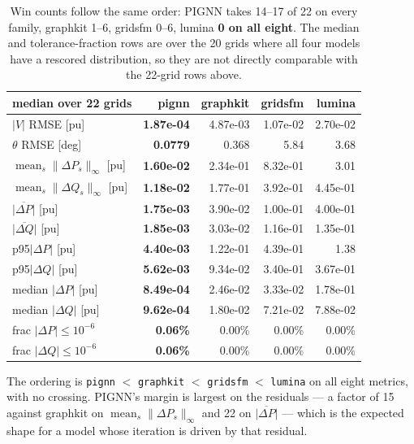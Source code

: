 \documentclass[10pt]{article}
\begin{document}
\begin{table}[H]
\centering\small
\begin{tabular}{lrrrr}
\toprule
median over 22 grids & pignn & graphkit & gridsfm & lumina \\
\midrule
$|V|$ RMSE [pu]              & \textbf{1.87e-04} & 4.87e-03 & 1.07e-02 & 2.70e-02 \\
$\theta$ RMSE [deg]          & \textbf{0.0779}   & 0.368    & 5.84     & 3.68 \\
$\operatorname{mean}_s\|\Delta P_s\|_\infty$ [pu] & \textbf{1.60e-02} & 2.34e-01 & 8.32e-01 & 3.01 \\
$\operatorname{mean}_s\|\Delta Q_s\|_\infty$ [pu] & \textbf{1.18e-02} & 1.77e-01 & 3.92e-01 & 4.45e-01 \\
$\overline{|\Delta P|}$ [pu] & \textbf{1.75e-03} & 3.90e-02 & 1.00e-01 & 4.00e-01 \\
$\overline{|\Delta Q|}$ [pu] & \textbf{1.85e-03} & 3.03e-02 & 1.16e-01 & 1.35e-01 \\
p95$|\Delta P|$ [pu]         & \textbf{4.40e-03} & 1.22e-01 & 4.39e-01 & 1.38 \\
p95$|\Delta Q|$ [pu]         & \textbf{5.62e-03} & 9.34e-02 & 3.40e-01 & 3.67e-01 \\
median $|\Delta P|$ [pu]   & \textbf{8.49e-04} & 2.46e-02 & 3.33e-02 & 1.78e-01 \\
median $|\Delta Q|$ [pu]   & \textbf{9.62e-04} & 1.80e-02 & 7.21e-02 & 7.88e-02 \\
frac $|\Delta P|\le10^{-6}$ & \textbf{0.06\%} & 0.00\% & 0.00\% & 0.00\% \\
frac $|\Delta Q|\le10^{-6}$ & \textbf{0.06\%} & 0.00\% & 0.00\% & 0.00\% \\
\bottomrule
\end{tabular}
\caption{Win counts follow the same order: PIGNN takes 14--17 of 22 on every
family, graphkit 1--6, gridsfm 0--6, lumina \textbf{0 on all eight}. The median
and tolerance-fraction rows are over the 20 grids where all four models have a
rescored distribution, so they are not directly comparable with the 22-grid
rows above.}
\end{table}

The ordering is \texttt{pignn} $<$ \texttt{graphkit} $<$ \texttt{gridsfm} $<$
\texttt{lumina} on all eight metrics, with no crossing. PIGNN's margin is
largest on the residuals --- a factor of 15 against graphkit on
$\operatorname{mean}_s\|\Delta P_s\|_\infty$ and 22 on $\overline{|\Delta P|}$ --- which is the expected
shape for a model whose iteration is driven by that residual.
\end{document}
